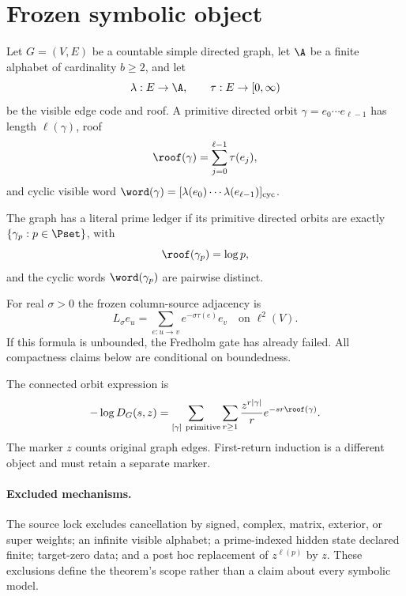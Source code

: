 \section{Frozen symbolic object}

Let $G=(V,E)$ be a countable simple directed graph, let
$\A$ be a finite alphabet of cardinality $b\ge2$, and let
\[
  \lambda:E\to\A,\qquad \tau:E\to[0,\infty)
\]
be the visible edge code and roof.  A primitive directed orbit
$\gamma=e_0\cdots e_{\ell-1}$ has length $\ell(\gamma)$, roof
\[
  \roof(\gamma)=\sum_{j=0}^{\ell-1}\tau(e_j),
\]
and cyclic visible word $\word(\gamma)=[\lambda(e_0)\cdots
\lambda(e_{\ell-1})]_{\mathrm{cyc}}$.

\begin{definition}\label{def:literal}
The graph has a literal prime ledger if its primitive directed orbits are
exactly $\{\gamma_p:p\in\Pset\}$, with
\[
  \roof(\gamma_p)=\log p,
\]
and the cyclic words $\word(\gamma_p)$ are pairwise distinct.
\end{definition}

For real $\sigma>0$ the frozen column-source adjacency is
\[
  L_\sigma e_u
    =\sum_{e:u\to v}e^{-\sigma\tau(e)}e_v
    \quad\text{on }\ell^2(V).
\]
If this formula is unbounded, the Fredholm gate has already failed.  All
compactness claims below are conditional on boundedness.

The connected orbit expression is
\[
  -\log D_G(s,z)
   =\sum_{[\gamma]\ {\rm primitive}}\sum_{r\ge1}
      \frac{z^{r|\gamma|}}r e^{-sr\roof(\gamma)}.
\]
The marker $z$ counts original graph edges.  First-return induction is a
different object and must retain a separate marker.

\paragraph{Excluded mechanisms.}
The source lock excludes cancellation by signed, complex, matrix, exterior,
or super weights; an infinite visible alphabet; a prime-indexed hidden
state declared finite; target-zero data; and a post hoc replacement of
$z^{\ell(p)}$ by $z$.  These exclusions define the theorem's scope rather
than a claim about every symbolic model.
